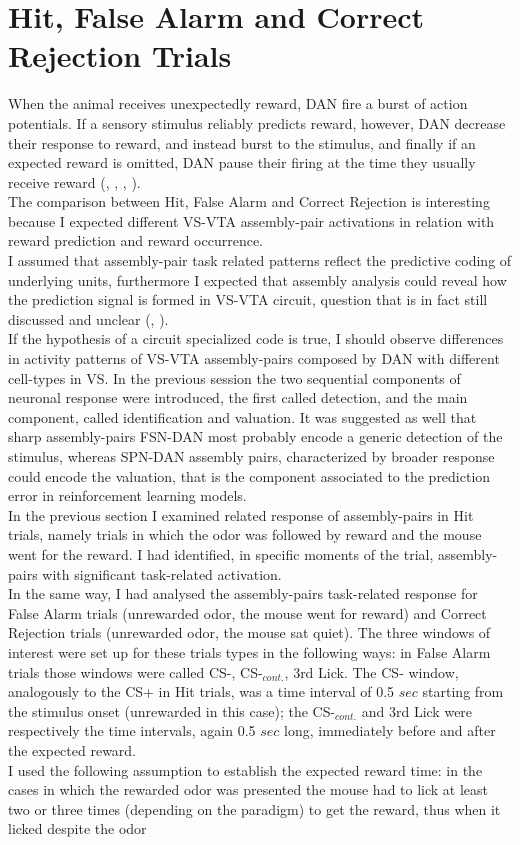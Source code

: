 \section{Hit, False Alarm and Correct Rejection Trials}
\label{sec:FalseAlCorrRej}
When the animal receives unexpectedly reward, DAN fire a burst of action potentials. If a sensory stimulus reliably predicts reward, however, DAN decrease their response to reward, and instead burst to the stimulus, and finally if an expected reward is omitted, DAN pause their firing at the time they usually receive reward (\cite{Schultz1997}, \cite{Wenzel}, \cite{Fiorillo2013b}, \cite{Schultz2015}).\\The comparison between Hit, False Alarm and Correct Rejection is interesting because I expected different VS-VTA assembly-pair activations in relation with reward prediction and reward occurrence.\\I assumed that assembly-pair task related patterns reflect the predictive coding of underlying units, furthermore I expected that assembly analysis could reveal how the prediction signal is formed in VS-VTA circuit, question that is in fact still discussed and unclear (\cite{Takahashi2016}, \cite{Saunders2018}).\\If the hypothesis of a circuit specialized code is true, I should observe differences in activity patterns of VS-VTA assembly-pairs composed by DAN with different cell-types in VS. In the previous session the two sequential components of neuronal response were introduced, the first called detection, and the main component, called identification and valuation. It was suggested as well that sharp assembly-pairs FSN-DAN most probably encode a generic detection of the stimulus, whereas SPN-DAN assembly pairs, characterized by broader response could encode the valuation, that is the component associated to the prediction error in reinforcement learning models.\\In the previous section I examined related response of assembly-pairs in Hit trials, namely trials in which the odor was followed by reward and the mouse went for the reward. I had identified, in specific moments of the trial, assembly-pairs with significant task-related activation.\\In the same way, I had analysed the assembly-pairs task-related response for False Alarm trials (unrewarded odor, the mouse went for reward) and Correct Rejection trials (unrewarded odor, the mouse sat quiet). The three windows of interest were set up for these trials types in the following ways: in False Alarm trials those windows were called CS-, CS-$_{cont.}$, 3rd Lick. The CS- window, analogously to the CS+ in Hit trials, was a time interval of 0.5 $sec$ starting from the stimulus onset (unrewarded in this case); the CS-$_{cont.}$ and 3rd Lick were respectively the time intervals, again 0.5 $sec$ long, immediately before and after the expected reward.\\I used the following assumption to establish the expected reward time: in the cases in which the rewarded odor was presented the mouse had to lick at least two or three times (depending on the paradigm) to get the reward, thus when it licked despite the odor 